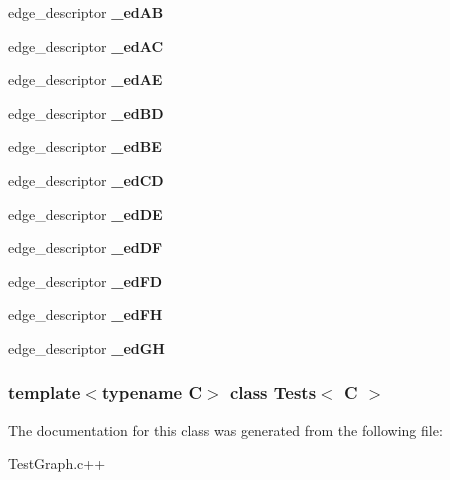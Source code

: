 \begin{DoxyCompactItemize}
\item 
\hypertarget{classTests_a8b41c7c1210e962393d7bd87e9458542}{edge\-\_\-descriptor {\bfseries \-\_\-ed\-A\-B}}\label{classTests_a8b41c7c1210e962393d7bd87e9458542}

\item 
\hypertarget{classTests_a00ca5eb198b6e0ae892cc4a05ff68ed6}{edge\-\_\-descriptor {\bfseries \-\_\-ed\-A\-C}}\label{classTests_a00ca5eb198b6e0ae892cc4a05ff68ed6}

\item 
\hypertarget{classTests_ab01d0c6d9a103bebff3c3fde9c8ad77d}{edge\-\_\-descriptor {\bfseries \-\_\-ed\-A\-E}}\label{classTests_ab01d0c6d9a103bebff3c3fde9c8ad77d}

\item 
\hypertarget{classTests_a301aabc695ebc9a4193d56352e139f4a}{edge\-\_\-descriptor {\bfseries \-\_\-ed\-B\-D}}\label{classTests_a301aabc695ebc9a4193d56352e139f4a}

\item 
\hypertarget{classTests_a45d1be2ed96848ebc9ce0c1e69b7b5d0}{edge\-\_\-descriptor {\bfseries \-\_\-ed\-B\-E}}\label{classTests_a45d1be2ed96848ebc9ce0c1e69b7b5d0}

\item 
\hypertarget{classTests_a20fe3767d24b3b5c6990616c2d5c8585}{edge\-\_\-descriptor {\bfseries \-\_\-ed\-C\-D}}\label{classTests_a20fe3767d24b3b5c6990616c2d5c8585}

\item 
\hypertarget{classTests_aec65bf2e9e27cf2aab71593702e0d69e}{edge\-\_\-descriptor {\bfseries \-\_\-ed\-D\-E}}\label{classTests_aec65bf2e9e27cf2aab71593702e0d69e}

\item 
\hypertarget{classTests_a666d3821e4d08626ea29dd9d12c3a853}{edge\-\_\-descriptor {\bfseries \-\_\-ed\-D\-F}}\label{classTests_a666d3821e4d08626ea29dd9d12c3a853}

\item 
\hypertarget{classTests_a58ad24030b32e8c1a1c1eca6c441b7ab}{edge\-\_\-descriptor {\bfseries \-\_\-ed\-F\-D}}\label{classTests_a58ad24030b32e8c1a1c1eca6c441b7ab}

\item 
\hypertarget{classTests_a9aa2d011300324b2f1d047ce9797bdd5}{edge\-\_\-descriptor {\bfseries \-\_\-ed\-F\-H}}\label{classTests_a9aa2d011300324b2f1d047ce9797bdd5}

\item 
\hypertarget{classTests_a58da8fd44a3c5d9296ec13d7cde723ae}{edge\-\_\-descriptor {\bfseries \-\_\-ed\-G\-H}}\label{classTests_a58da8fd44a3c5d9296ec13d7cde723ae}

\end{DoxyCompactItemize}
\subsubsection*{template$<$typename C$>$ class Tests$<$ C $>$}



\-The documentation for this class was generated from the following file\-:\begin{DoxyCompactItemize}
\item 
\-Test\-Graph.\-c++\end{DoxyCompactItemize}

